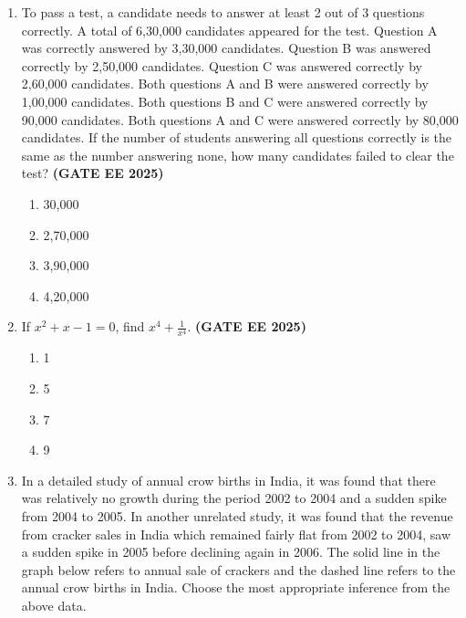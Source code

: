 \documentclass[journal,12pt,onecolumn]{IEEEtran}
\theoremstyle{remark}
\begin{document}
\begin{enumerate}
\item To pass a test, a candidate needs to answer at least 2 out of 3 questions correctly. A total of 6,30,000 candidates appeared for the test. Question A was correctly answered by 3,30,000 candidates. Question B was answered correctly by 2,50,000 candidates. Question C was answered correctly by 2,60,000 candidates. Both questions A and B were answered correctly by 1,00,000 candidates. Both questions B and C were answered correctly by 90,000 candidates. Both questions A and C were answered correctly by 80,000 candidates. If the number of students answering all questions correctly is the same as the number answering none, how many candidates failed to clear the test?
\hfill \textbf{(GATE EE 2025)} \begin{enumerate}
    \item 30,000
    \item 2,70,000
    \item 3,90,000
    \item 4,20,000
\end{enumerate}


\item If $x^{2}+x-1=0$, find $x^4+\frac{1}{x^4}$.
\hfill \textbf{(GATE EE 2025)} \begin{enumerate}
    \item 1
    \item 5
    \item 7
    \item 9
\end{enumerate}


\item In a detailed study of annual crow births in India, it was found that there was relatively no growth during the period 2002 to 2004 and a sudden spike from 2004 to 2005. In another unrelated study, it was found that the revenue from cracker sales in India which remained fairly flat from 2002 to 2004, saw a sudden spike in 2005 before declining again in 2006. The solid line in the graph below refers to annual sale of crackers and the dashed line refers to the annual crow births in India. Choose the most appropriate inference from the above data.


\end{enumerate}
\end{document}
